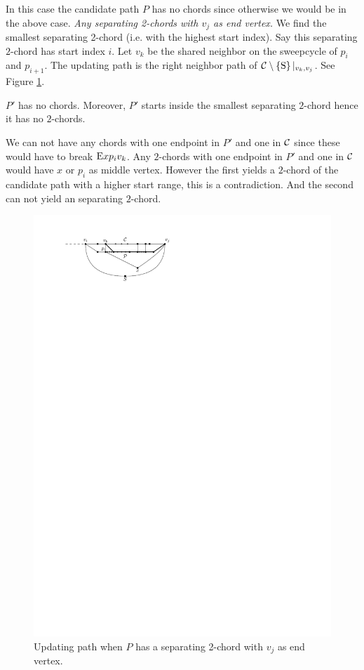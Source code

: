     In this case the candidate path $P$ has no chords since otherwise we would be in the above case.
    \emph{Any separating 2-chords with $v_j$ as end vertex.}
      We find the smallest separating 2-chord (i.e. with the highest start index). Say this separating $2$-chord has start index $i$.
      Let $v_k$ be the shared neighbor on the sweepcycle of $p_{i}$ and $p_{i +1}$. The updating path is the right neighbor path of $\mathcal{C} \setminus \left\lbrace {\mathrm{S}} \right\rbrace|_{v_k, v_j}$. See Figure \ref{fig:sweep:pEBound}.

      $P'$ has no chords. Moreover, $P'$ starts inside the smallest separating $2$-chord hence it has no $2$-chords.

      We can not have any chords with one endpoint in $P'$ and one in $\mathcal{C}$  since these would have to break $\mathrm{E} x p_i v_k$. Any $2$-chords with one endpoint in $P'$ and one in $\mathcal{C}$ would have $x$ or $p_i$ as middle vertex. However the first yields a $2$-chord of the candidate path with a higher start range, this is a contradiction. And the second can not yield an separating $2$-chord.

    \begin{figure}[h]
      \centering
      \includegraphics[scale=1]{unifiedAlgo/img/sweep/pEBound}
      \caption{Updating path when $P$ has a separating 2-chord with $v_j$ as end vertex.}
      \label{fig:sweep:pEBound}
    \end{figure}


